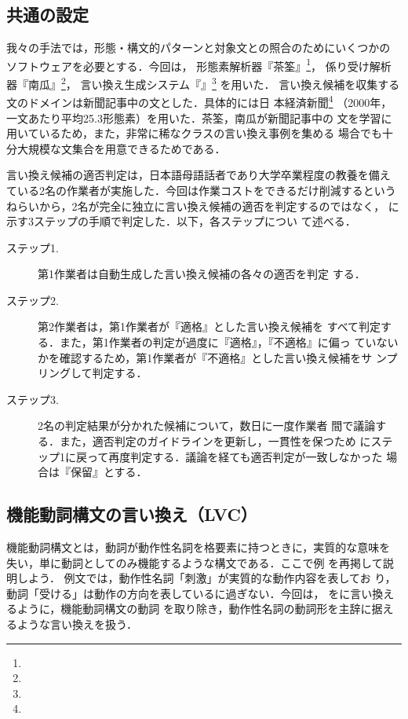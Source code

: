 \subsection{共通の設定}
\label{ssec:setting}

我々の手法では，形態・構文的パターンと対象文との照合のためにいくつかの
ソフトウェアを必要とする．今回は，
形態素解析器『茶筌』\footnote{}，
係り受け解析器『南瓜』\footnote{}，
言い換え生成システム『{\KURA}』\footnote{}
を用いた．
言い換え候補を収集する文のドメインは新聞記事中の文とした．具体的には日
本経済新聞\footnote{}
（2000年，一文あたり平均25.3形態素）を用いた．茶筌，南瓜が新聞記事中の
文を学習に用いているため，また，非常に稀なクラスの言い換え事例を集める
場合でも十分大規模な文集合を用意できるためである．

言い換え候補の適否判定は，日本語母語話者であり大学卒業程度の教養を備え
ている2名の作業者が実施した．今回は作業コストをできるだけ削減するという
ねらいから，2名が完全に独立に言い換え候補の適否を判定するのではなく，
に示す3ステップの手順で判定した．以下，各ステップについ
て述べる．
\begin{description}
\item[ステップ1.] 第1作業者は自動生成した言い換え候補の各々の適否を判定
  する．
\item[ステップ2.] 第2作業者は，第1作業者が『適格』とした言い換え候補を
  すべて判定する．また，第1作業者の判定が過度に『適格』，『不適格』に偏っ
  ていないかを確認するため，第1作業者が『不適格』とした言い換え候補をサ
  ンプリングして判定する．
\item[ステップ3.] 2名の判定結果が分かれた候補について，数日に一度作業者
  間で議論する．また，適否判定のガイドラインを更新し，一貫性を保つため
  にステップ1に戻って再度判定する．議論を経ても適否判定が一致しなかった
  場合は『保留』とする．
\end{description}

\subsection{機能動詞構文の言い換え（LVC）}
\label{ssec:lvc}

機能動詞構文とは，動詞が動作性名詞を格要素に持つときに，実質的な意味を
失い，単に動詞としてのみ機能するような構文である．ここで例
を再掲して説明しよう．
例文では，動作性名詞「刺激」が実質的な動作内容を表してお
り，動詞「受ける」は動作の方向を表しているに過ぎない．今回は，
をに言い換えるように，機能動詞構文の動詞
を取り除き，動作性名詞の動詞形を主辞に据えるような言い換えを扱う．



